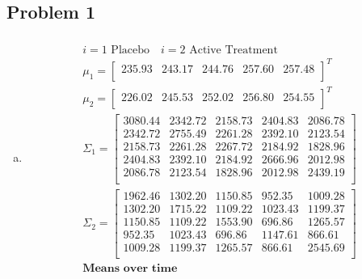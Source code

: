 \documentclass{article}
\begin{document}
\begin{flushleft}

\section*{Problem 1}
\begin{enumerate}[(a)]
\item

\begin{multline*}\\
i=1 \text{ Placebo} \quad i=2 \text{ Active Treatment}\\
\mu_1=\left[
\begin{array}{rrrrr}
235.93 & 243.17 & 244.76 & 257.60 & 257.48 \\ 
\end{array}
\right]^T\\
\mu_2=\left[
\begin{array}{rrrrr}
226.02 & 245.53 & 252.02 & 256.80 & 254.55 \\ 
\end{array}
\right]^T\\
\Sigma_1=\left[
\begin{array}{rrrrr}
3080.44 & 2342.72 & 2158.73 & 2404.83 & 2086.78 \\ 
2342.72 & 2755.49 & 2261.28 & 2392.10 & 2123.54 \\ 
2158.73 & 2261.28 & 2267.72 & 2184.92 & 1828.96 \\ 
2404.83 & 2392.10 & 2184.92 & 2666.96 & 2012.98 \\ 
2086.78 & 2123.54 & 1828.96 & 2012.98 & 2439.19 \\ 
\end{array}
\right]\\
\Sigma_2=\left[
\begin{array}{rrrrr}
1962.46 & 1302.20 & 1150.85 & 952.35 & 1009.28 \\ 
1302.20 & 1715.22 & 1109.22 & 1023.43 & 1199.37 \\ 
1150.85 & 1109.22 & 1553.90 & 696.86 & 1265.57 \\ 
952.35 & 1023.43 & 696.86 & 1147.61 & 866.61 \\ 
1009.28 & 1199.37 & 1265.57 & 866.61 & 2545.69 \\ 
\end{array}
\right]\\
\textbf{Means over time}\\

\end{multline*}
\end{enumerate}
\end{flushleft}
\end{document}
